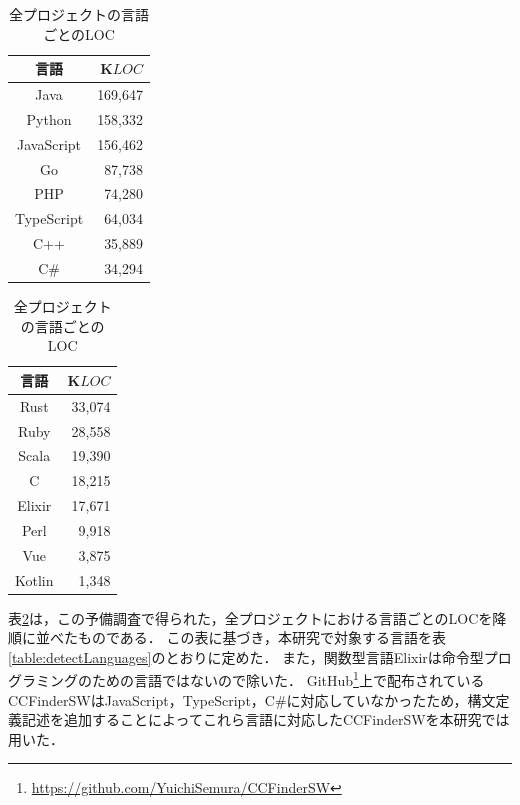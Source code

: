 \documentclass[T,J]{fose}
\begin{document}
\begin{table}[t]
    \centering
    \caption{全プロジェクトの言語ごとのLOC}
    \label{tab:locOfAllProjects}
    \begin{minipage}[]{0.49\columnwidth}
    \centering
    \small
    \begin{tabular}{|c|r|}
    \hline \hline
    言語 & K$LOC$ \\
    \hline \hline
    Java & 169,647 \\
    \hline
    Python & 158,332 \\
    \hline
    JavaScript & 156,462 \\
    \hline
    Go & 87,738 \\
    \hline
    PHP & 74,280 \\
    \hline
    TypeScript & 64,034 \\
    \hline
    C++ & 35,889 \\
    \hline
    C\# & 34,294 \\
    \hline \hline
    \end{tabular}
    \end{minipage}
    \begin{minipage}[]{0.49\columnwidth}
    \centering
    \small
    \begin{tabular}{|c|r|}
    \hline \hline
    言語 & K$LOC$ \\
    \hline \hline
    Rust & 33,074 \\
    \hline
    Ruby & 28,558 \\
    \hline
    Scala & 19,390 \\
    \hline
    C & 18,215 \\
    \hline
    Elixir & 17,671 \\
    \hline
    Perl & 9,918 \\
    \hline
    Vue & 3,875 \\
    \hline
    Kotlin & 1,348 \\
    \hline \hline
    \end{tabular}
    \end{minipage}
\end{table}


表\ref{tab:locOfAllProjects}は，この予備調査で得られた，全プロジェクトにおける言語ごとのLOCを降順に並べたものである．
この表に基づき，本研究で対象する言語を表\ref{table:detectLanguages}のとおりに定めた．
また，関数型言語Elixirは命令型プログラミングのための言語ではないので除いた．
GitHub\footnote{\url{https://github.com/YuichiSemura/CCFinderSW}}上で配布されているCCFinderSWはJavaScript，TypeScript，C\#に対応していなかったため，構文定義記述を追加することによってこれら言語に対応したCCFinderSWを本研究では用いた．
\end{document}
